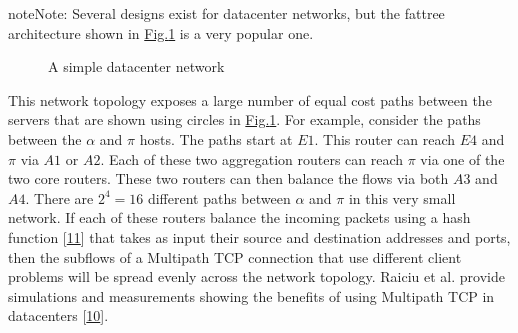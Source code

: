 \documentclass[letterpaper,10pt,english]{sphinxmanual}
\begin{document}
\begin{sphinxadmonition}{note}{Note:}
\sphinxAtStartPar
Several designs exist for datacenter networks, but the fat\sphinxhyphen{}tree architecture shown in \hyperref[\detokenize{mptcp:fig-fat-tree}]{Fig.\@ \ref{\detokenize{mptcp:fig-fat-tree}}} is a very popular one.
\begin{figure}[H]\centering\capstart {}\caption{A simple datacenter network}\label{\detokenize{mptcp:id57}}\label{\detokenize{mptcp:fig-fat-tree}}\end{figure}
\sphinxAtStartPar
This network topology exposes a large number of equal cost paths between the servers that are shown using circles in \hyperref[\detokenize{mptcp:fig-fat-tree}]{Fig.\@ \ref{\detokenize{mptcp:fig-fat-tree}}}. For example, consider the paths between the \(\alpha\) and \(\pi\) hosts. The paths start at \(E1\). This router can reach \(E4\) and \(\pi\) via \(A1\) or \(A2\). Each of these two aggregation routers can reach \(\pi\) via one of the two core routers. These two routers can then balance the flows via both \(A3\) and \(A4\). There are \(2^{4}=16\) different paths between \(\alpha\) and \(\pi\) in this very small network. If each of these routers balance the incoming packets using a hash function {[}\hyperlink{cite.biblio:id2922}{11}{]} that takes as input their source and destination addresses and ports, then the subflows of a Multipath TCP connection that use different client problems will be spread evenly across the network topology.  Raiciu et al. provide simulations and measurements showing the benefits of using Multipath TCP in datacenters {[}\hyperlink{cite.biblio:id8933}{10}{]}.
\end{sphinxadmonition}
\end{document}
